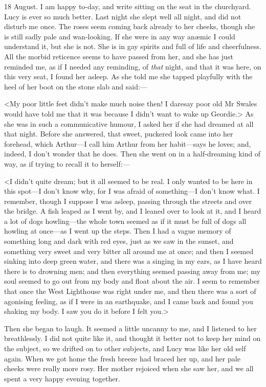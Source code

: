 \begin{diary}{18 August.}
I am happy to-day, and write sitting on the seat in the churchyard. Lucy is ever so much better. Last night she slept well all night, and did not disturb me once. The roses seem coming back already to her cheeks, though she is still sadly pale and wan-looking. If she were in any way anæmic I could understand it, but she is not. She is in gay spirits and full of life and cheerfulness. All the morbid reticence seems to have passed from her, and she has just reminded me, as if I needed any reminding, of \textit{that} night, and that it was here, on this very seat, I found her asleep. As she told me she tapped playfully with the heel of her boot on the stone slab and said:—

<My poor little feet didn't make much noise then! I daresay poor old Mr Swales would have told me that it was because I didn't want to wake up Geordie.> As she was in such a communicative humour, I asked her if she had dreamed at all that night. Before she answered, that sweet, puckered look came into her forehead, which Arthur—I call him Arthur from her habit—says he loves; and, indeed, I don't wonder that he does. Then she went on in a half-dreaming kind of way, as if trying to recall it to herself:—

<I didn't quite dream; but it all seemed to be real. I only wanted to be here in this spot—I don't know why, for I was afraid of something—I don't know what. I remember, though I suppose I was asleep, passing through the streets and over the bridge. A fish leaped as I went by, and I leaned over to look at it, and I heard a lot of dogs howling—the whole town seemed as if it must be full of dogs all howling at once—as I went up the steps. Then I had a vague memory of something long and dark with red eyes, just as we saw in the sunset, and something very sweet and very bitter all around me at once; and then I seemed sinking into deep green water, and there was a singing in my ears, as I have heard there is to drowning men; and then everything seemed passing away from me; my soul seemed to go out from my body and float about the air. I seem to remember that once the West Lighthouse was right under me, and then there was a sort of agonising feeling, as if I were in an earthquake, and I came back and found you shaking my body. I saw you do it before I felt you.>

Then she began to laugh. It seemed a little uncanny to me, and I listened to her breathlessly. I did not quite like it, and thought it better not to keep her mind on the subject, so we drifted on to other subjects, and Lucy was like her old self again. When we got home the fresh breeze had braced her up, and her pale cheeks were really more rosy. Her mother rejoiced when she saw her, and we all spent a very happy evening together.
\end{diary}
 

